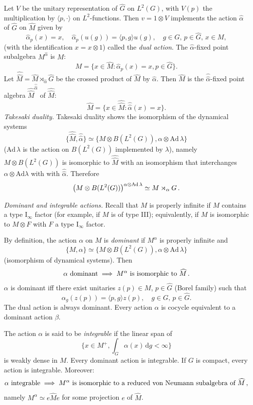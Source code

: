 \documentclass[11pt,a4paper]{article}
\def\be{\begin{equation}}
\def\ee{\end{equation}}
\def\hat{\widehat}
\def\l{\langle}
\def\hat{\widehat}
\def\Ad{{\mathrm {Ad}}}
\def\l{\lambda}
\def\al{\alpha}
\begin{document}
Let $V$ be the unitary representation of $\hat G$ on $L^2(G)$, with $V(p)$ the multiplication by $\langle p,\cdot\rangle$ on $L^2$-functions. Then $v = 1\otimes V$ implements
the action $\hat \al$ of $\hat G$ on $\hat M$ given by
\be
 \hat\al_p(x) = x,\quad \hat\al_p(u(g)) = \langle p,g\rangle u(g),\quad  g\in G,\, p\in \hat G,\, x\in M,
\ee
(with the identification $x = x\otimes 1$) called  the {\it dual action}. The $\hat\al$-fixed point subalgebra $M^{\hat\al}$ is $M$:
\be
M = \{x\in\hat M : \hat\al_p(x) = x, p\in \hat G\}.
\ee
Let $\hat{\hat M} = \hat M \rtimes_{\hat \al} \hat G$ be the crossed product of $\hat M$ by $\hat \al$. Then $\hat M$ is the $\hat{\hat \al}$-fixed point algebra
$\hat{\hat M}^{\hat{\hat \al}}$ of 
$\hat{\hat M}$:
\be
\hat M = \{x\in \hat{\hat M} : \hat{\hat \al}(x) = x\}.
\ee
\noindent
{\it Takesaki duality.} 
Takesaki duality shows the isomorphism of the dynamical systems
\be
\{\hat{\hat M},  \hat{\hat \al}\} \simeq \{M\otimes B(L^2(G)),\al\otimes \Ad \,\l\}
\ee
($\Ad\, \l$ is the action on $ B(L^2(G))$ implemented by $\l$),
namely $M\otimes  B(L^2(G))$ is isomorphic to $\hat{\hat M}$ with an isomorphism
that interchanges $\alpha\otimes \Ad\lambda$ with
 with $\hat{\hat \al}$. Therefore
\be
\big(M\otimes  B(L^2(G))\big)^{\al\otimes {\rm Ad}\,\l} \simeq M\rtimes_\al G \, .
\ee
\smallskip

\noindent
{\it Dominant and integrable actions.} 
Recall that $M$ is properly infinite if $M$ contains a type I$_\infty$ factor (for example, if $M$ is of type III); equivalently, if $M$ is isomorphic to $M\otimes F$ with $F$ a type I$_\infty$ factor. 

By definition, the action $\al$ on $M$ is {\it dominant} if $M^\al$ is properly infinite and
\be
\{M,\al\} \simeq \{M\otimes  B(L^2(G)), \al\otimes \Ad\,\l\}
\ee
(isomorphism of dynamical systems). 
Then
\be
\al\ {\rm dominant} \implies M^\al \ \text{is isomorphic to} \ \hat M\, .
\ee
$\al$ is dominant iff there exist unitaries $z(p)\in M$, $p\in \hat G$ (Borel family)
such that 
\be
\al_g(z(p)) = \langle p, g\rangle z(p), \quad g\in G,\,  p\in \hat G. 
\ee
The dual action is always dominant. 
Every action $\al$  is cocycle equivalent to a dominant action $\beta$. 

The action $\al$ is said to be {\it integrable} if the linear span of
\be
\big\{x\in M^+, \int_G \al(x)\,{\mathrm d}g < \infty \big\} 
\ee
is weakly dense in $M$. Every dominant action is integrable. If $G$ is compact, every action is integrable. 
Moreover:
\be
\al \ {\rm integrable}\implies M^\al \ \text{is isomorphic to a reduced von Neumann subalgebra of $\hat M$}\, ,
\ee
namely $M^\al \simeq e\hat M e$ for some projection $e$ of $\hat M$. 
\smallskip
\end{document}
